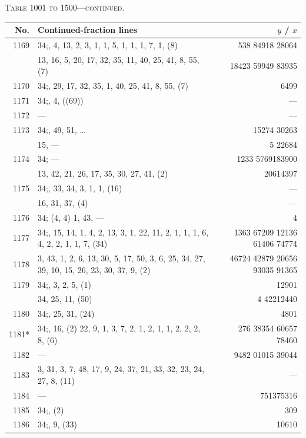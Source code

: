 \documentclass[11pt]{article}
\newcommand{\peheading}{%
  \begin{center}\small\textsc{Table 1001 to 1500---continued.}\end{center}
}
\begin{document}
\peheading
\renewcommand{\arraystretch}{1.15}
{\footnotesize
\begin{longtable}{|r|p{8.5cm}|r|}
\hline
\textbf{No.} & \textbf{Continued-fraction lines} & \textbf{$y$ \;/\; $x$}\\
\hline\endhead
1169   & $34$;\; 5, 4, 13, 2, 3, 1, 1, 5, 1, 1, 1, 7, 1, (8) & 538 84918 28064 \\
       & 13, 16, 5, 20, 17, 32, 35, 11, 40, 25, 41, 8, 55, (7) & 18423 59949 83935 \\
\hline
1170   & $34$;\; 1, 29, 17, 32, 35, 1, 40, 25, 41, 8, 55, (7) & 6499 \\
\hline
1171   & $34$;\; 5, 4, ((69)) & --- \\
\hline
1172   & --- & --- \\
\hline
1173   & $34$;\; 4, 49, 51, \dots & 15274 30263 \\
       & 15, --- & 5 22684 \\
\hline
1174   & $34$;\; --- & 1233 5769183900 \\
       & 13, 42, 21, 26, 17, 35, 30, 27, 41, (2) & 20614397 \\
\hline
1175   & $34$;\; 16, 33, 34, 3, 1, 1, (16) & --- \\
       & 16, 31, 37, (4) & --- \\
\hline
1176   & $34$;\; (4, 4) 1, 43, --- & 4 \\
\hline
1177   & $34$;\; 18, 15, 14, 1, 4, 2, 13, 3, 1, 22, 11, 2, 1, 1, 1, 6, 4, 2, 2, 1, 1, 7, (34) & 1363 67209 12136 61406 74774 \\
\hline
1178   & 3, 43, 1, 2, 6, 13, 30, 5, 17, 50, 3, 6, 25, 34, 27, 39, 10, 15, 26, 23, 30, 37, 9, (2) & 46724 42879 20656 93035 91365 \\
\hline
1179   & $34$;\; 19, 3, 2, 5, (1) & 12901 \\
       & 34, 25, 11, (50) & 4 42212440 \\
\hline
1180   & $34$;\; 20, 25, 31, (24) & 4801 \\
\hline
1181*  & $34$;\; 21, 16, (2) 22, 9, 1, 3, 7, 2, 1, 2, 1, 1, 2, 2, 2, 8, (6) & 276 38354 60657 78460 \\
\hline
1182   & --- & 9482 01015 39044 \\
\hline
1183   & 3, 31, 3, 7, 48, 17, 9, 24, 37, 21, 33, 32, 23, 24, 27, 8, (11) & --- \\
\hline
1184   & --- & 751375316 \\
\hline
1185   & $34$;\; 22, (2) & 309 \\
\hline
1186   & $34$;\; 23, 9, (33) & 10610 \\

\end{longtable}}
\end{document}
